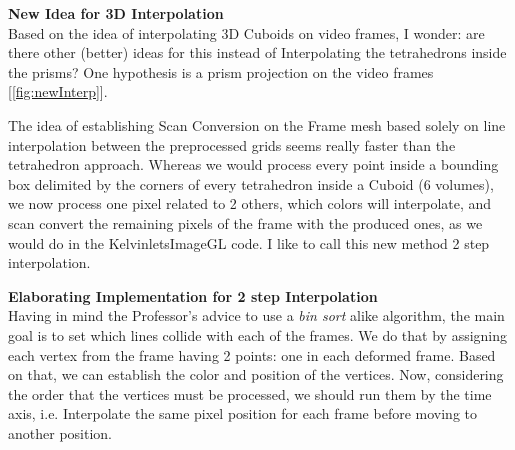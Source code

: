\documentclass[14pt]{book}
\newenvironment{loggentry}[2]%
{\noindent\textbf{#2}\marginnote{#1}\\}{\vspace{1.0cm}}
\begin{document}
\begin{loggentry}{28-05-2019}{New Idea for 3D Interpolation}
	Based on the idea of interpolating 3D Cuboids on video frames, I wonder: are there other (better) ideas for this instead of Interpolating the tetrahedrons inside the prisms? One hypothesis is a prism projection on the video frames [\ref{fig:newInterp}].	

	The idea of establishing Scan Conversion on the Frame mesh based solely on line interpolation between the preprocessed grids seems really faster than the tetrahedron approach. Whereas we would process every point inside a bounding box delimited by the corners of every tetrahedron inside a Cuboid (6 volumes), we now process one pixel related to 2 others, which colors will interpolate, and scan convert the remaining pixels of the frame with the produced ones, as we would do in the KelvinletsImageGL code. I like to call this new method 2 step interpolation.  
\end{loggentry}

\begin{loggentry}{30-05-2019}{Elaborating Implementation for 2 step Interpolation}
		Having in mind the Professor's advice to use a \textit{bin sort} alike algorithm, the main goal is to set which lines collide with each of the frames. We do that by assigning each vertex from the frame having 2 points: one in each deformed frame. Based on that, we can establish the color and position of the vertices. Now, considering the order that the vertices must be processed, we should run them by the time axis, i.e. Interpolate the same pixel position for each frame before moving to another position.    
\end{loggentry}
\end{document}
